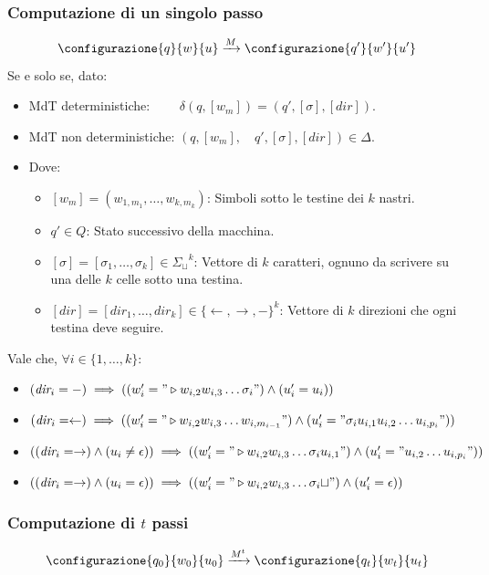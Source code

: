 \subsubsection{Computazione di un singolo passo}
\[
\configurazione{q}{w}{u}
\xrightarrow{M}
\configurazione{q'}{w'}{u'}
\]
Se e solo se, dato:
\begin{itemize}
\item MdT deterministiche: $\qquad \delta(q, [{w_m}]) = (q', [\sigma], [\textit{dir}])$.
\item MdT non deterministiche: $(q, [w_m],\quad q', [\sigma], [\textit{dir}]) \in \Delta$.
\item Dove:
\begin{itemize}
	\item $[{w_m}] = ({w_{1,m_1}}, \dots, {w_{k,m_k}})$: Simboli sotto le testine dei $k$ nastri.
    \item $q' \in Q$: Stato successivo della macchina.
    \item $[\sigma] = [\sigma_1, \dots, \sigma_k] \in {\Sigma_\sqcup}^k$: Vettore di $k$ caratteri, ognuno da scrivere su una delle $k$ celle sotto una testina.
    \item $[\textit{dir}] = [\textit{dir}_1, \dots, \textit{dir}_k] \in \{\leftarrow, \rightarrow, -\}^k$: Vettore di $k$ direzioni che ogni testina deve seguire.
\end{itemize}
\end{itemize}
Vale che, $\forall i \in \{1, \dots, k\} :$
{\small
\begin{itemize}
    \item $(\textit{dir}_i = -) \implies ((w'_i = "\triangleright w_{i,2} w_{i,3} \dots {\sigma_i}") \land (u'_i = u_i))$
    \item $(\textit{dir}_i = \leftarrow) \implies ((w'_i = "\triangleright w_{i,2} w_{i,3} \dots {w_{i,m_{i-1}}}") \land (u'_i = "\sigma_i u_{i,1} u_{i,2} \dots u_{i,p_i}"))$
    \item $((\textit{dir}_i = \rightarrow) \land (u_i \neq \epsilon)) \implies ((w'_i = "\triangleright w_{i,2} w_{i,3} \dots \sigma_i {u_{i,1}}") \land (u'_i = "u_{i,2} \dots u_{i,p_i}")) $
    \item $((\textit{dir}_i = \rightarrow) \land (u_i = \epsilon)) \implies ((w'_i = "\triangleright w_{i,2} w_{i,3} \dots \sigma_i {\sqcup}") \land (u'_i = \epsilon)) $
\end{itemize}
}

\subsubsection{Computazione di $t$ passi}
\[
\configurazione{q_0}{w_0}{u_0}
\xrightarrow{M^t}
\configurazione{q_t}{w_t}{u_t}
\]

